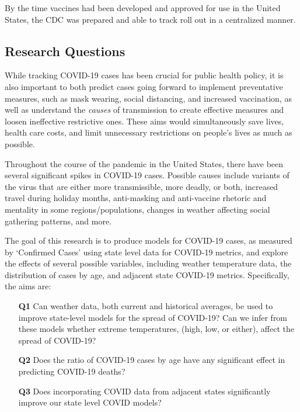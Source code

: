 \documentclass[11pt]{article}
\begin{document}
	By the time vaccines had been developed and approved for use in the United States, the CDC was prepared and able to track roll out in a centralized manner. 
	

\subsection{Research Questions}

While tracking COVID-19 cases has been crucial for public health policy, it is also important to both predict cases going forward to implement preventative measures, such as mask wearing, social distancing, and increased vaccination, as well as understand the \textit{causes} of transmission to create effective measures and loosen ineffective restrictive ones. These aims would simultaneously save lives, health care costs, and limit unnecessary restrictions on people's lives as much as possible. 

Throughout the course of the pandemic in the United States, there have been several significant spikes in COVID-19 cases. Possible causes include variants of the virus that are either more transmissible, more deadly, or both, increased travel during holiday months, anti-masking and anti-vaccine rhetoric and mentality in some regions/populations, changes in weather affecting social gathering patterns, and more. 

The goal of this research is to produce models for COVID-19 cases, as measured by `Confirmed Cases' using state level data for COVID-19 metrics, and explore the effects of several possible variables, including weather temperature data,  the distribution of cases by age, and adjacent state COVID-19 metrics.  Specifically, the aims are: 
\begin{enumerate}
\item[\bf Q1] Can weather data, both current and historical averages, be used to improve state-level models for the spread of COVID-19? Can we infer from these models whether extreme temperatures, (high, low, or either), affect the spread of COVID-19? 
\item[\bf Q2] Does the ratio of COVID-19 cases by age have any significant effect in predicting COVID-19 deaths?
\item[\bf Q3] Does incorporating COVID data from adjacent states significantly improve our state level COVID models?
\end{enumerate}
\end{document}
